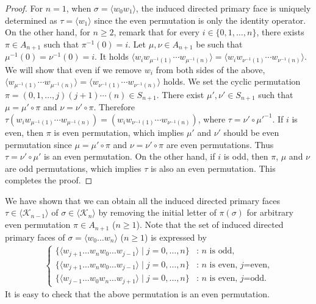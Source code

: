 \documentclass[a4paper,12pt]{article}
\newcommand{\bra}{\langle}
\newcommand{\ket}{\rangle}
\numberwithin{equation}{section}
\begin{document}
\begin{proof}
For $n=1$, when $\sigma=\bra w_0w_1\ket$, the induced directed primary face is uniquely determined as $\tau=\bra w_1\ket$ since the even permutation
is only the identity operator. 
On the other hand, for $n\geq 2$, remark that for every $i\in \{0,1,\dots,n\}$, there exists $\pi\in A_{n+1}$ such that $\pi^{-1}(0)=i$. 
Let $\mu,\nu\in A_{n+1}$ be such that $\mu^{-1}(0)=\nu^{-1}(0)=i$.
It holds
$\langle w_{i}w_{\mu^{-1}(1)}\cdots w_{\mu^{-1}(n)}\rangle=\langle w_{i}w_{\nu^{-1}(1)}\cdots w_{\nu^{-1}(n)}\rangle$. 
We will show that even if we remove $w_i$ from both sides of the above, 
	$\langle w_{\mu^{-1}(1)}\cdots w_{\mu^{-1}(n)}\rangle=\langle w_{\nu^{-1}(1)}\cdots w_{\nu^{-1}(n)}\rangle$ holds. 
We set the cyclic permutation $\pi=(0,1,\dots,j)(j+1)\cdots (n)\in S_{n+1}$.
There exist $\mu', \nu' \in S_{n+1}$ such that $\mu=\mu'\circ \pi$ and $\nu=\nu'\circ \pi$. 
Therefore $\tau(w_{i}w_{\mu^{-1}(1)}\cdots w_{\mu^{-1}(n)})=(w_{i}w_{\nu^{-1}(1)}\cdots w_{\nu^{-1}(n)})$, 
where $\tau=\nu'\circ {\mu'}^{-1}$. 
If $i$ is even, then $\pi$ is even permutation, which implies $\mu'$ and $\nu'$ should be even permutation since $\mu=\mu'\circ\pi$ 
and $\nu=\nu'\circ \pi$ are even permutations. 
Thus $\tau=\nu'\circ \mu'$ is an even permutation. 
On the other hand, if $i$ is odd, then $\pi$, $\mu$ and $\nu$ are odd permutations, which implies $\tau$ is also an even permutation. 
This completes the proof. 
\end{proof}
%
We have shown that we can obtain all the induced directed primary faces $\tau\in \bra \mathcal{K}_{n-1} \ket$ of $\sigma\in \bra \mathcal{K}_n \ket$
by removing the initial letter of $\pi(\sigma)$ for arbitrary even permutation $\pi\in A_{n+1}$ ($n\geq 1$). 
Note that the set of induced directed primary faces of $\sigma=\bra w_0\dots w_n \ket$ ($n\geq 1$) is expressed by 
\begin{align}\label{iipp}
	\begin{cases} 
        \{\bra w_{j+1}\dots w_{n}w_0\dots w_{j-1} \ket \;|\; j=0,\dots,n \} & \text{: $n$ is odd,}  \\
        \{\bra w_{j+1}\dots w_{n}w_0\dots w_{j-1} \ket \;|\; j=0,\dots,n \} & \text{: $n$ is even, $j$=even,} \\
        \{\bra w_{j-1}\dots w_{0}w_n\dots w_{j+1} \ket \;|\; j=0,\dots,n \} & \text{: $n$ is even, $j$=odd.}
	\end{cases}
\end{align}
It is easy to check that the above permutation is an even permutation. 
\end{document}
